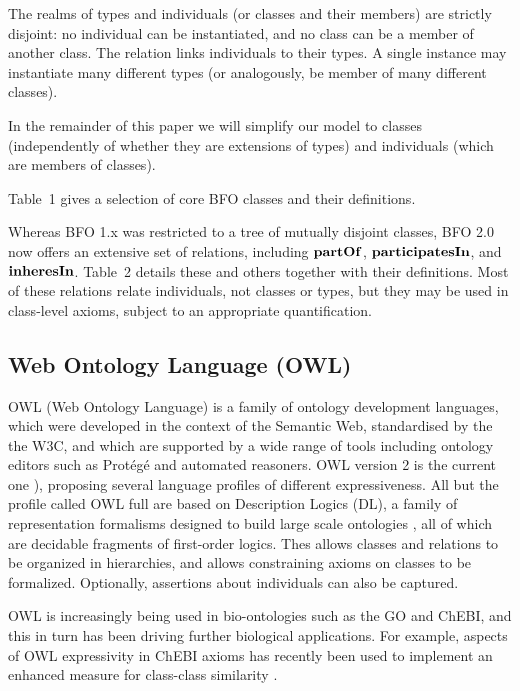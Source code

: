 The realms of types and individuals (or classes and their members) 
are strictly disjoint: no individual can be instantiated, and no class can be a member of another class. The relation  links individuals to their types. A single instance may instantiate many different types (or analogously, be member of many different classes). 

In the remainder of this paper we will simplify our model to classes (independently of whether they are extensions of types) and individuals (which are members of classes). 

 Table~1 gives a selection of core BFO classes and their definitions.

Whereas BFO 1.x was restricted to a tree of mutually disjoint classes, BFO 2.0 now offers an extensive set of relations, including $\mathrm{\mathbf{partOf}}$, $\mathrm{\mathbf{participatesIn}}$, and $\mathrm{\mathbf{inheresIn}}$.
 Table~2 details these and others together with their definitions. Most of these relations relate individuals, not classes or types, but they may be used in class-level axioms, 
subject to an appropriate quantification.

\subsection*{Web Ontology Language (OWL)}

OWL (Web Ontology Language) is a family of ontology development languages, which were developed in the context of the Semantic Web, standardised by the the W3C, and which are supported by a wide range of tools including ontology editors such as Prot\'eg\'e and automated reasoners. OWL version 2 is the current one \cite{grau2008}), proposing several language profiles of different expressiveness. All but the profile called OWL full are based on Description Logics (DL), a family of
representation formalisms designed to build large scale ontologies \cite{baader2007dlhandbook}, all of which are decidable fragments of first-order logics. 
Thes allows classes and relations to be organized in hierarchies, and allows constraining axioms on classes to be formalized. Optionally, assertions about individuals can also be captured. 

OWL is increasingly being used in bio-ontologies such as the GO and ChEBI, and this in turn has been driving further biological applications. For example, aspects of OWL expressivity in ChEBI axioms has recently been used to implement an enhanced measure for class-class similarity \cite{ferreira2013exploiting}.


